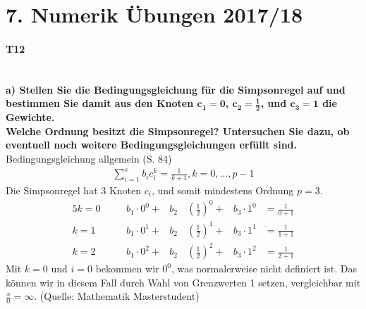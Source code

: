\documentclass[10pt,a4paper]{article}
\begin{document}
	\section*{7. Numerik Übungen 2017/18}
	\paragraph{T12}\mbox{}\\
	\textbf{%
		a) Stellen Sie die Bedingungsgleichung für die Simpsonregel auf und bestimmen Sie damit aus den Knoten $\pmb{c_1=0}$, $\pmb{c_2=\frac{1}{2}}$, und $\pmb{c_3=1}$ die Gewichte.\\
        Welche Ordnung besitzt die Simpsonregel? Untersuchen Sie dazu, ob eventuell noch weitere Bedingungsgleichungen erfüllt sind.
	}\\
    Bedingungsgleichung allgemein (S. 84)
	\begin{align}\tag{4.31}
		\sum_{i=1}^{s}b_ic_i^k = \frac{1}{k+1}, k=0, \dots, p-1
	\end{align}
	Die Simpsonregel hat 3 Knoten $c_i$, und somit mindestens Ordnung $p = 3$.
	\begin{alignat*}{5}
		k=0 & \quad & b_1\cdot 0^0+ & b_2 \, & \left(\frac{1}{2}\right)^0+ & b_3\cdot1^0 & = \frac{1}{0+1} \\
		k=1 & \quad & b_1\cdot 0^1+ & b_2 \, & \left(\frac{1}{2}\right)^1+ & b_3\cdot1^1 & = \frac{1}{1+1} \\
		k=2 & \quad & b_1\cdot 0^2+ & b_2 \, & \left(\frac{1}{2}\right)^2+ & b_3\cdot1^2 & = \frac{1}{2+1}
		\end{alignat*}
		Mit $k=0$ und $i=0$ bekommen wir $0^0$, was normalerweise nicht definiert ist. Das können wir in diesem Fall durch Wahl von Grenzwerten 1 setzen, vergleichbar mit $\frac{x}{0}=\infty$. (Quelle: Mathematik Masterstudent)
\end{document}

